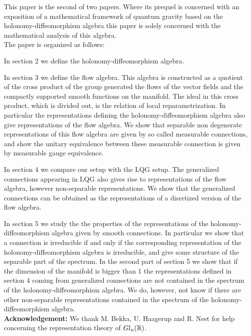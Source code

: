 \documentclass[12pt]{article}
\newcommand{\bbR}{{\Bbb R}}
\begin{document}
This paper is the second of two papers. Where its prequel \cite{AastrupGrimstrup1} is concerned with an exposition of a mathematical framework of quantum gravity based on the holonomy-diffeomorphism algebra this paper is solely concerned with the mathematical analysis of this algebra. \\


The paper is organized as follows:  

In section 2 we define the holonomy-diffeomorphism algebra. 

In section 3 we define the flow algebra. This algebra is constructed as a quotient of the cross product of the group generated the flows of the vector fields and the compactly supported smooth functions on the manifold. The ideal in this cross product, which is divided out, is the relation of local reparametrization. In particular the representations defining the holonomy-diffeomorphism algebra also give representations of the flow algebra.
We show that separable non degenerate representations of this flow algebra are given by so called measurable connections, and show the unitary equivalence between these measurable connection is given by measurable gauge equivalence.  

In section 4 we compare our setup with the LQG setup. The generalized connections appearing in LQG also gives rise to representations of the flow algebra, however non-separable representations. We show that the generalized connections can be obtained as the representations of a disretized version of the flow algebra. 

In section 5 we study the the properties of the representations of the holonomy-diffeomorphism algebra given by smooth connections. In particular we show that a connection is irreducible if and only if the corresponding representation of the holonomy-diffeomorphism algebra is irreducible, and give some structure of the separable part of the spectrum. 
In the second part of section 5 we show that if the dimension of the manifold is bigger than 1 the representations defined in section 4 coming from generalized connections are not contained in the spectrum of the holonomy-diffeomorphism algebra. We do, however, not know if there are other non-separable representations contained in the spectrum of the holonomy-diffeomorphism algebra.  \\ 


\textbf{Acknowledgement:} We thank M. Bekka, U. Haagerup and R. Nest for help concerning the representation theory of $Gl_n(\bbR )$.
\end{document}
